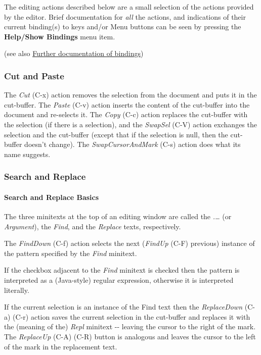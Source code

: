 \documentclass[
]{article}
\begin{document}
The editing actions described below are a small selection of the actions
provided by the editor. Brief documentation for \emph{all} the actions,
and indications of their current binding(s) to keys and/or Menu buttons
can be seen by pressing the \textbf{Help/Show Bindings} menu item.

(see also \href{Bindings.html}{Further documentation of bindings})

\hypertarget{cut-and-paste}{%
\subsubsection{Cut and Paste}\label{cut-and-paste}}

The \emph{Cut} (C-x) action removes the selection from the document and
puts it in the cut-buffer. The \emph{Paste} (C-v) action inserts the
content of the cut-buffer into the document and re-selects it. The
\emph{Copy} (C-c) action replaces the cut-buffer with the selection (if
there is a selection), and the \emph{SwapSel} (C-V) action exchanges the
selection and the cut-buffer (except that if the selection is null, then
the cut-buffer doesn't change). The \emph{SwapCursorAndMark} (C-s)
action does what its name suggests.

\hypertarget{search-and-replace}{%
\subsubsection{Search and Replace}\label{search-and-replace}}

\hypertarget{search-and-replace-basics}{%
\paragraph{Search and Replace Basics}\label{search-and-replace-basics}}

The three minitexts at the top of an editing window are called the
\emph{.\ldots{}} (or \emph{Argument}), the \emph{Find}, and the
\emph{Replace} texts, respectively.

The \emph{FindDown} (C-f) action selects the next (\emph{FindUp} (C-F)
previous) instance of the pattern specified by the \emph{Find} minitext.

If the checkbox adjacent to the \emph{Find} minitext is checked then the
pattern is interpreted as a (Java-style) regular expression, otherwise
it is interpreted literally.

If the current selection is an instance of the Find text then the
\emph{ReplaceDown} (C-a) (C-r) action saves the current selection in the
cut-buffer and replaces it with the (meaning of the) \emph{Repl}
minitext -\/- leaving the cursor to the right of the mark. The
\emph{ReplaceUp} (C-A) (C-R) button is analogous and leaves the cursor
to the left of the mark in the replacement text.
\end{document}
